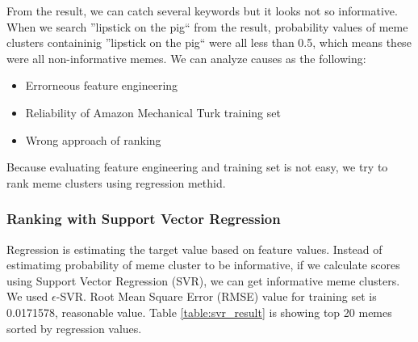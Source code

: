 \documentclass{sig-alternate}
\begin{document}
From the result, we can catch several keywords but it looks not so informative. When we search ''lipstick on the pig`` from the result, probability values of meme clusters containinig ''lipstick on the pig`` were all less than 0.5, which means these were all non-informative memes. We can analyze causes as the following:
\begin{itemize}
 \item Errorneous feature engineering
 \item Reliability of Amazon Mechanical Turk training set
 \item Wrong approach of ranking
\end{itemize}

Because evaluating feature engineering and training set is not easy, we try to rank meme clusters using regression methid.

\subsubsection{Ranking with Support Vector Regression}
Regression is estimating the target value based on feature values. Instead of estimatimg probability of meme cluster to be informative, if we calculate scores using Support Vector Regression (SVR), we can get informative meme clusters. We used $\epsilon$-SVR. Root Mean Square Error (RMSE) value for training set is 0.0171578, reasonable value. Table \ref{table:svr_result} is showing top 20 memes sorted by regression values.
\end{document}
